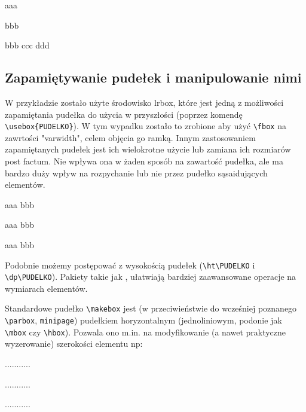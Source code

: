 \documentclass[fontSize=10pt,extra]{pdfArticle}
\begin{document}
\begin{Example}
 \newsavebox{\fmbox}
 \begin{lrbox}{\fmbox}
  \begin{varwidth}{0.4\textwidth}
    aaa  \par
   bbb \par bbb ccc ddd
  \end{varwidth}
 \end{lrbox}
 \fbox{\usebox{\fmbox}}
\end{Example}


\subsection{Zapamiętywanie pudełek i manipulowanie nimi}

W przykładzie zostało użyte środowisko lrbox, które jest jedną z możliwości zapamiętania pudełka do użycia w przyszłości (poprzez komendę \Verb#\usebox{PUDELKO}#).
W tym wypadku zostało to zrobione aby użyć \Verb#\fbox# na zawrtości "varwidth", celem objęcia go ramką.
Innym zastosowaniem zapamiętanych pudełek jest ich wielokrotne użycie lub zamiana ich rozmiarów post factum.
Nie wpływa ona w żaden sposób na zawartość pudełka, ale ma bardzo duży wpływ na rozpychanie lub nie przez pudełko sąsaidujących elementów.

\begin{Example}
 \begin{lrbox}{\fmbox}  \end{lrbox}
 aaa \usebox{\fmbox} bbb \par
 \wd\fmbox=0pt aaa \usebox{\fmbox} bbb \par
 \wd\fmbox=70pt aaa \usebox{\fmbox} bbb
\end{Example}

Podobnie możemy postępować z wysokością pudełek (\Verb#\ht\PUDELKO# i \Verb#\dp\PUDELKO#). Pakiety takie jak ,  ułatwiają bardziej zaawansowane operacje na wymiarach elementów.

Standardowe pudełko \Verb#\makebox# jest (w przeciwieństwie do wcześniej poznanego \Verb#\parbox#, \Verb#minipage#) pudełkiem horyzontalnym (jednoliniowym, podonie jak \Verb#\mbox# czy \Verb#\hbox#).
Pozwala ono m.in. na modyfikowanie (a nawet praktyczne wyzerowanie) szerokości elementu np:
\begin{Example}
\ttfamily
.....\makebox[0.1pt][l]{-----}...... \par
.....\makebox[0.1pt][c]{-----}...... \par
.....\makebox[0.1pt][c]{\vbox{+\\+\\+}}......
\end{Example}
\end{document}
